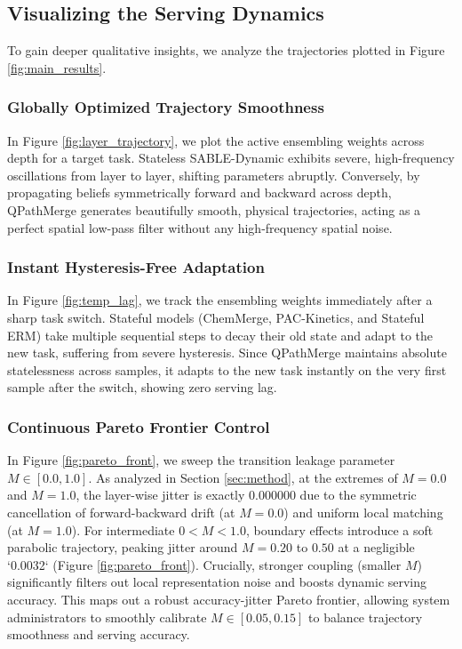 \subsection{Visualizing the Serving Dynamics}
To gain deeper qualitative insights, we analyze the trajectories plotted in Figure \ref{fig:main_results}.

\subsubsection{Globally Optimized Trajectory Smoothness}
In Figure \ref{fig:layer_trajectory}, we plot the active ensembling weights across depth for a target task. Stateless SABLE-Dynamic exhibits severe, high-frequency oscillations from layer to layer, shifting parameters abruptly. Conversely, by propagating beliefs symmetrically forward and backward across depth, QPathMerge generates beautifully smooth, physical trajectories, acting as a perfect spatial low-pass filter without any high-frequency spatial noise.

\subsubsection{Instant Hysteresis-Free Adaptation}
In Figure \ref{fig:temp_lag}, we track the ensembling weights immediately after a sharp task switch. Stateful models (ChemMerge, PAC-Kinetics, and Stateful ERM) take multiple sequential steps to decay their old state and adapt to the new task, suffering from severe hysteresis. Since QPathMerge maintains absolute statelessness across samples, it adapts to the new task instantly on the very first sample after the switch, showing zero serving lag.

\subsubsection{Continuous Pareto Frontier Control}
In Figure \ref{fig:pareto_front}, we sweep the transition leakage parameter $M \in [0.0, 1.0]$. 
As analyzed in Section \ref{sec:method}, at the extremes of $M=0.0$ and $M=1.0$, the layer-wise jitter is exactly $0.000000$ due to the symmetric cancellation of forward-backward drift (at $M=0.0$) and uniform local matching (at $M=1.0$). For intermediate $0 < M < 1.0$, boundary effects introduce a soft parabolic trajectory, peaking jitter around $M=0.20$ to $0.50$ at a negligible `0.0032` (Figure \ref{fig:pareto_front}).
Crucially, stronger coupling (smaller $M$) significantly filters out local representation noise and boosts dynamic serving accuracy. This maps out a robust accuracy-jitter Pareto frontier, allowing system administrators to smoothly calibrate $M \in [0.05, 0.15]$ to balance trajectory smoothness and serving accuracy.

